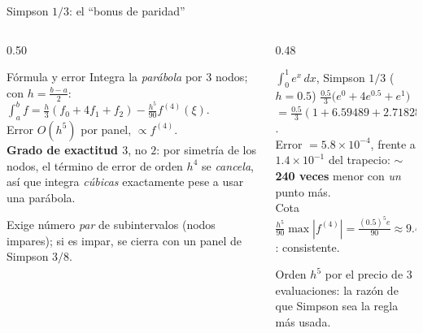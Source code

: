 \documentclass[aspectratio=169,10pt]{beamer}
\begin{document}
\begin{frame}{Simpson $1/3$: el ``bonus de paridad''}
\begin{columns}[T]
\begin{column}{0.50\textwidth}
\begin{cardidea}{Fórmula y error}{\faSuperscript}
{\footnotesize Integra la \emph{parábola} por $3$ nodos; con $h=\tfrac{b-a}{2}$:\\[0.5mm]
$\displaystyle\int_a^b f=\frac{h}{3}(f_0+4f_1+f_2)-\frac{h^5}{90}f^{(4)}(\xi)$.\\[1.0mm]
Error $O(h^5)$ por panel, $\propto f^{(4)}$.\\[0.6mm]
\textbf{Grado de exactitud $3$}, no $2$: por simetría de los nodos, el término de error de orden $h^4$ se \emph{cancela}, así que integra \emph{cúbicas} exactamente pese a usar una parábola.}
\end{cardidea}
\vspace{1mm}
\begin{cardnota}[\faExclamationTriangle]
{\footnotesize Exige número \emph{par} de subintervalos (nodos impares); si es impar, se cierra con un panel de Simpson $3/8$.}
\end{cardnota}
\end{column}
\begin{column}{0.48\textwidth}
\begin{cardgear}{$\int_0^1 e^x\,dx$, Simpson $1/3$ ($h=0.5$)}{\faCalculator}
{\footnotesize $\tfrac{0.5}{3}\big(e^0+4e^{0.5}+e^1\big)$\\[0.4mm]
$=\tfrac{0.5}{3}(1+6.59489+2.71828)=1.71886$.\\[0.8mm]
Error $=5.8{\times}10^{-4}$, frente a $1.4{\times}10^{-1}$ del trapecio: $\sim$\textbf{240 veces} menor con \emph{un} punto más.\\[0.6mm]
Cota $\tfrac{h^5}{90}\max|f^{(4)}|=\tfrac{(0.5)^5 e}{90}\approx9.4{\times}10^{-4}$: consistente.}
\end{cardgear}
\vspace{1mm}
\begin{cardnota}[\faInfoCircle]
{\footnotesize Orden $h^5$ por el precio de $3$ evaluaciones: la razón de que Simpson sea la regla más usada.}
\end{cardnota}
\end{column}
\end{columns}
\end{frame}
\end{document}
